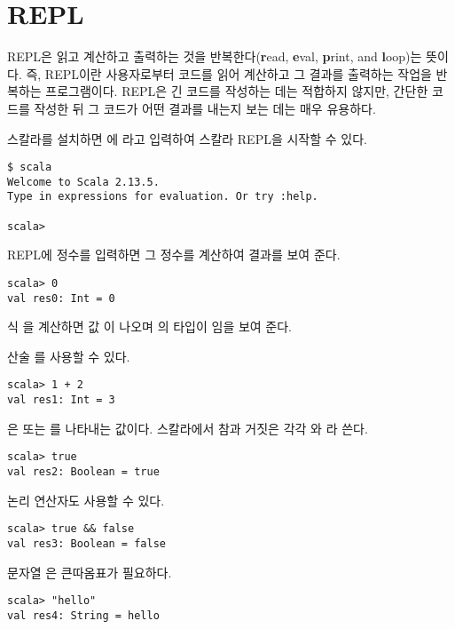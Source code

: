 \section{REPL}

REPL은 읽고 계산하고 출력하는 것을 반복한다(\textbf{r}ead,
\textbf{e}val, \textbf{p}rint, and \textbf{l}oop)는
뜻이다. 즉, REPL이란 사용자로부터 코드를 읽어 계산하고 그 결과를 출력하는 작업을
반복하는 프로그램이다. REPL은 긴 코드를 작성하는 데는 적합하지 않지만, 간단한
코드를 작성한 뒤 그 코드가 어떤 결과를 내는지 보는 데는 매우 유용하다.

스칼라를 설치하면 에 라고 입력하여 스칼라 REPL을 시작할 수 있다.

\begin{verbatim}
$ scala
Welcome to Scala 2.13.5.
Type in expressions for evaluation. Or try :help.

scala>
\end{verbatim}

REPL에 정수를 입력하면 그 정수를 계산하여 결과를 보여 준다.

\begin{verbatim}
scala> 0
val res0: Int = 0
\end{verbatim}

식 을 계산하면 값 이 나오며 의 타입이 임을 보여 준다.

산술 를 사용할 수 있다.

\begin{verbatim}
scala> 1 + 2
val res1: Int = 3
\end{verbatim}

은  또는 를 나타내는
값이다. 스칼라에서 참과 거짓은 각각 와 라 쓴다.

\begin{verbatim}
scala> true
val res2: Boolean = true
\end{verbatim}

논리 연산자도 사용할 수 있다.

\begin{verbatim}
scala> true && false
val res3: Boolean = false
\end{verbatim}

문자열 은 큰따옴표가 필요하다.

\begin{verbatim}
scala> "hello"
val res4: String = hello
\end{verbatim}

